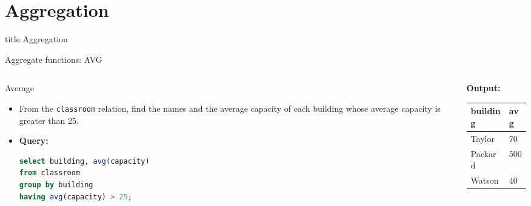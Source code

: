 \documentclass[aspectratio=169, xcolor=dvipsnames]{beamer}
\begin{document}
\section{Aggregation}
\begin{frame}
  \vfill
  \centering
  \begin{beamercolorbox}[sep=8pt,center,shadow=true,rounded=true]{title}
    Aggregation\par%
  \end{beamercolorbox}
  \vfill
\end{frame}

\begin{frame}[fragile]{Aggregate functions: AVG}
    \begin{columns}
        \begin{column}{0.6\textwidth}
            \begin{block}{Average}
                \begin{itemize}
                    \item From the \texttt{classroom} relation, find the names and the average capacity of each building whose average capacity is greater than 25.
                    \item \textbf{Query:}
                    \begin{lstlisting}[language=SQL]
select building, avg(capacity) 
from classroom 
group by building 
having avg(capacity) > 25;
                    \end{lstlisting}
                \end{itemize}
            \end{block}
        \end{column}
        \begin{column}{0.4\textwidth}
            \textbf{Output:}
            \begin{center}
                \begin{adjustbox}{max width=\textwidth}
                \begin{tabular}{|l|l|}
                \hline
                \textbf{building} & \textbf{avg} \\ \hline
                Taylor & 70 \\ \hline
                Packard & 500 \\ \hline
                Watson & 40 \\ \hline
                \end{tabular}
                \end{adjustbox}
            \end{center}
        \end{column}
    \end{columns}
\end{frame}
\end{document}
